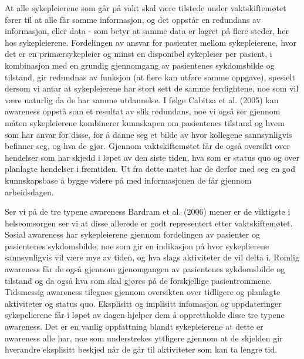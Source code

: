 \noindent
At alle sykepleierene som går på vakt skal være tilstede under vaktskiftemøtet fører til at alle får samme informasjon, og det oppstår en redundans av informasjon, eller data - som betyr at samme data er lagret på flere steder, her hos sykepleierene. Fordelingen av ansvar for pasienter mellom sykepleierene, hvor det er en primærsykepleier og minst en disponibel sykepleier per pasient, i kombinasjon med en grundig gjennomgang av pasientenes sykdomsbilde og tilstand, gir redundnas av funksjon (at flere kan utføre samme oppgave), spesielt dersom vi antar at sykepleierene har stort sett de samme ferdightene, noe som vil være naturlig da de har samme utdannelse. I følge Cabitza et al. (2005) kan awareness oppstå som et resultat av slik redundans, noe vi også ser gjennom måten sykepleierene kombinerer kunnskapen om pasientenes tilstand og hvem som har anvar for disse, for å danne seg et bilde av hvor kollegene sannsynligvis befinner seg, og hva de gjør.
Gjennom vaktskiftemøtet får de også oversikt over hendelser som har skjedd i løpet av den siste tiden, hva som er status quo og over planlagte hendelser i fremtiden. Ut fra dette møtet har de derfor med seg en god kunnskapsbase å bygge videre på med informasjonen de får gjennom arbeidsdagen. 

\noindent
Ser vi på de tre typene awareness Bardram et al. (2006) mener er de viktigste i helseomsorgen ser vi at disse allerede er godt representert etter vaktskiftemøtet. Sosial awareness har sykepleierene gjennom fordelingen av pasienter og pasientenes sykdomsbilde, noe som gir en indikasjon på hvor sykeplierene sannsynligvis vil være mye av tiden, og hva slags aktiviteter de vil delta i. Romlig awareness får de også gjennom gjenomgangen av pasientenes sykdomsbilde og tilstand og da også hva som skal gjøres på de forskjellige pasientrommene. Tidsmessig awareness tilegnes gjennom oversikten over tidligere og planlagte aktiviteter og status quo. Eksplisitt og implisitt infomasjon og oppdateringer sykepelierene får i løpet av dagen hjelper dem å opprettholde disse tre typene awareness. Det er en vanlig oppfattning blandt sykepleierene at dette er awareness alle har, noe som understrekes yttligere gjennom at de skjelden gir hverandre eksplisitt beskjed når de går til aktiviteter som kan ta lengre tid. 

